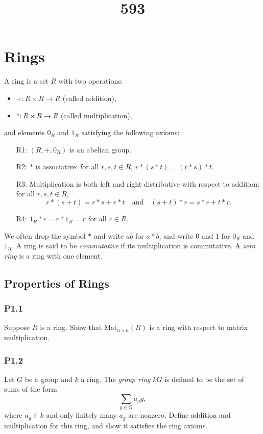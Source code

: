 \documentclass[lang=cn,11pt]{template}
\title{593}
\begin{document}
\frontmatter
\tableofcontents
\mainmatter

\chapter{Rings}

\begin{definition}
A ring is a set \( R \) with two operations:
\begin{itemize}
    \item \( + : R \times R \to R \) (called addition),
    \item \( * : R \times R \to R \) (called multiplication),
\end{itemize}
and elements \( 0_R \) and \( 1_R \) satisfying the following axioms:
\begin{itemize}
    \item[R1:] \( (R, +, 0_R) \) is an abelian group.
    \item[R2:] \( * \) is associative: for all \( r, s, t \in R \), \( r * (s * t) = (r * s) * t \).
    \item[R3:] Multiplication is both left and right distributive with respect to addition: for all \( r, s, t \in R \),
    \[
    r * (s + t) = r * s + r * t \quad \text{and} \quad (s + t) * r = s * r + t * r.
    \]
    \item[R4:] \( 1_R * r = r * 1_R = r \) for all \( r \in R \).
\end{itemize}
We often drop the symbol \( * \) and write \( ab \) for \( a * b \), and write \( 0 \) and \( 1 \) for \( 0_R \) and \( 1_R \). A ring is said to be \textit{commutative} if its multiplication is commutative. A \textit{zero ring} is a ring with one element.
\end{definition}

\section{Properties of Rings}

\subsection*{P1.1} Suppose \( R \) is a ring. Show that \( \text{Mat}_{n \times n}(R) \) is a ring with respect to matrix multiplication.

\subsection*{P1.2} Let \( G \) be a group and \( k \) a ring. The \textit{group ring} \( kG \) is defined to be the set of sums of the form
\[
\sum_{g \in G} a_g g,
\]
where \( a_g \in k \) and only finitely many \( a_g \) are nonzero. Define addition and multiplication for this ring, and show it satisfies the ring axioms.
\end{document}
